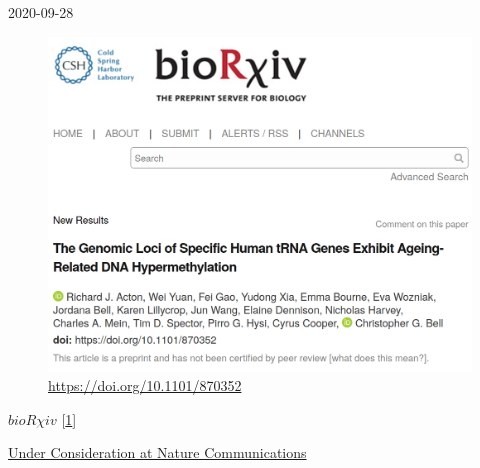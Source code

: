 \documentclass[
]{book}
\begin{document}
2020-09-28

\begin{figure}
\centering
\includegraphics{figs/biorxiv_screenshot.png}
\caption{\url{https://doi.org/10.1101/870352}}
\end{figure}

\href{https://doi.org/10.1101/870352}{\(bioR \chi iv\)} {[}\protect\hyperlink{ref-Acton2020}{1}{]}

\href{https://nature-research-under-consideration.nature.com/users/37265-nature-communications/posts/57741-the-genomic-loci-of-specific-human-trna-genes-exhibit-ageing-related-dna-hypermethylation}{Under Consideration at Nature Communications}
\end{document}
